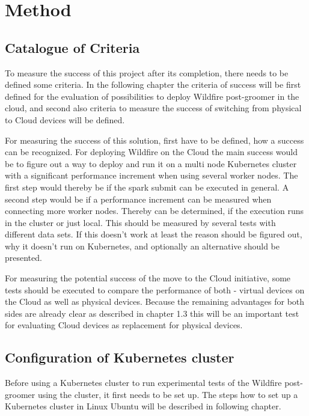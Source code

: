 
\chapter{Method}

\section{Catalogue of Criteria}

To measure the success of this project after its completion, there needs to be defined some criteria. In the following chapter the criteria of success will be first defined for the evaluation of possibilities to deploy Wildfire post-groomer in the cloud, and second also criteria to measure the success of switching from physical to Cloud devices will be defined.

For measuring the success of this solution, first have to be defined, how a success can be recognized.
For deploying Wildfire on the Cloud the main success would be to figure out a way to deploy and run it on a multi node Kubernetes cluster with a significant performance increment when using several worker nodes. The first step would thereby be if the spark submit can be executed in general. A second step would be if a performance increment can be measured when connecting more worker nodes. Thereby can be determined, if the execution runs in the cluster or just local. This should be measured by several tests with different data sets. If this doesn't work at least the reason should be figured out, why it doesn't run on Kubernetes, and optionally an alternative should be presented.

For measuring the potential success of the move to the Cloud initiative, some tests should be executed to compare the performance of both - virtual devices on the Cloud as well as physical devices. Because the remaining advantages for both sides are already clear as described in chapter 1.3 this will be an important test for evaluating Cloud devices as replacement for physical devices.

\section{Configuration of Kubernetes cluster}

Before using a Kubernetes cluster to run experimental tests of the Wildfire post-groomer using the cluster, it first needs to be set up. The steps how to set up a Kubernetes cluster in Linux Ubuntu will be described in following chapter.

